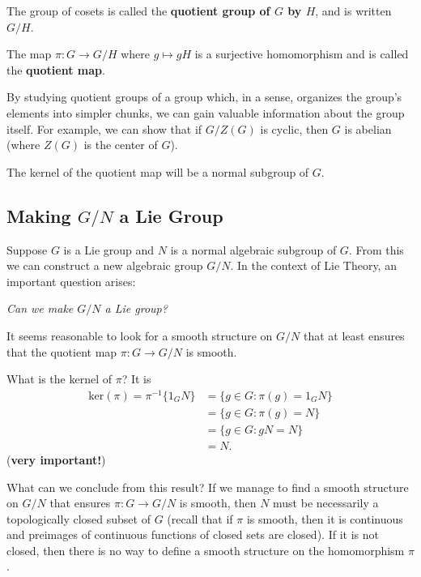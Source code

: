 The group of cosets is called the \textbf{quotient group of \( G  \) by \( H  \)}, and is written \( G /  H \).

\begin{remark}
   The map \( \pi : G \to G / H \) where \( g \mapsto g H  \) is a surjective homomorphism and is called the \textbf{quotient map}. 
\end{remark}

By studying quotient groups of a group which, in a sense, organizes the group's elements into simpler chunks, we can gain valuable information about the group itself. For example, we can show that if \( G / Z(G) \) is cyclic, then \( G  \) is abelian (where \( Z(G) \) is the center of \( G  \)).

The kernel of the quotient map will be a normal subgroup of \( G  \).

\subsection{Making \( G / N  \) a Lie Group}

\begin{remark}[Observation]
   Suppose \( G  \) is a Lie group and \( N \) is a normal algebraic subgroup of \( G  \). From this we can construct a new algebraic group \( G / N   \). In the context of Lie Theory, an important question arises: 
   \begin{center}
        \textit{Can we make \( G / N  \) a Lie group?} 
   \end{center}
   It seems reasonable to look for a smooth structure on \( G / N  \) that at least ensures that the quotient map \( \pi : G \to G / N \) is smooth. 
\end{remark}

What is the kernel of \( \pi  \)? It is 
\begin{align*}
    \text{ker}(\pi)   =  \pi^{-1}  \{  {1 }_{G } N  \} &= \{  g \in G : \pi(g) = {1}_{G} N  \}   \\
                                                       &= \{  g \in G : \pi (g) =  N \}  \\
                                                       &= \{ g \in G : g N =  N \}  \\
                                                       &= N. 
\end{align*}
(\textbf{very important!})

What can we conclude from this result? If we manage to find a smooth structure on \( G / N  \) that ensures \( \pi : G \to G / N   \) is smooth, then \( N  \) must be necessarily a topologically closed subset of \( G  \) (recall that if \( \pi  \) is smooth, then it is continuous and preimages of continuous functions of closed sets are closed). If it is not closed, then there is no way to define a smooth structure on the homomorphism \( \pi \).

